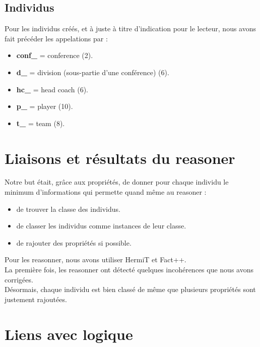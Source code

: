 \documentclass[a4paper,11pt]{article}
\begin{document}
\subsection{Individus}

Pour les individus créés, et à juste à titre d'indication pour le lecteur, nous avons fait précéder les appelations par : \\
\begin{itemize}
    \item \textbf{conf\_} = conference (2).
    \item \textbf{d\_} = division (sous-partie d'une conférence) (6).
    \item \textbf{hc\_} = head coach (6).
    \item \textbf{p\_} = player (10).
    \item \textbf{t\_} = team (8). 
\end{itemize}

\section{Liaisons et résultats du reasoner}
\label{sec-3}

Notre but était, grâce aux propriétés, de donner pour chaque individu le minimum d'informations qui permette quand même au reasoner :

\begin{itemize}
    \item de trouver la classe des individus.
    \item de classer les individus comme instances de leur classe.
    \item de rajouter des propriétés si possible. \\
\end{itemize} 

Pour les reasonner, nous avons utiliser HermiT et Fact++. \\

La première fois, les reasonner ont détecté quelques incohérences que nous avons corrigées. \\

Désormais, chaque individu est bien classé de même que plusieurs propriétés sont justement rajoutées. \\


\newpage
\section{Liens avec logique}
\label{sec-4}
\end{document}
